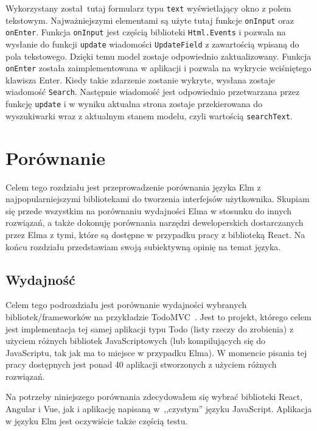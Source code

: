 \documentclass[twoside,a4paper]{report}
\begin{document}
Wykorzystany został tutaj formularz typu \texttt{text} wyświetlający okno z polem tekstowym.
Najważniejszymi elementami są użyte tutaj funkcje \texttt{onInput} oraz \texttt{onEnter}.
Funkcja \texttt{onInput} jest częścią biblioteki \texttt{Html.Events} i pozwala na wysłanie do funkcji \texttt{update} wiadomości \texttt{UpdateField} z zawartością wpisaną do pola tekstowego.
Dzięki temu model zostaje odpowiednio zaktualizowany.
Funkcja \texttt{onEnter} została zaimplementowana w aplikacji i pozwala na wykrycie wciśniętego klawisza Enter.
Kiedy takie zdarzenie zostanie wykryte, wysłana zostaje wiadomość \texttt{Search}.
Następnie wiadomość jest odpowiednio przetwarzana przez funkcję \texttt{update} i w wyniku aktualna strona zostaje przekierowana do wyszukiwarki wraz z aktualnym stanem modelu, czyli wartością \texttt{searchText}.


\chapter{Porównanie}
Celem tego rozdziału jest przeprowadzenie porównania języka Elm z najpopularniejszymi bibliotekami do tworzenia interfejsów użytkownika.
Skupiam się przede wszystkim na porównaniu wydajności Elma w stosunku do innych rozwiązań, a także dokonuję porównania narzędzi deweloperskich dostarczanych przez Elma z tymi, które są dostępne w przypadku pracy z biblioteką React.
Na końcu rozdziału przedstawiam swoją subiektywną opinię na temat języka.

\section{Wydajność}
Celem tego podrozdziału jest porównanie wydajności wybranych bibliotek/frameworków na przykładzie TodoMVC~\cite{todomvc}.
Jest to projekt, którego celem jest implementacja tej samej aplikacji typu Todo (listy rzeczy do zrobienia) z użyciem różnych bibliotek JavaScriptowych (lub kompilujących się do JavaScriptu, tak jak ma to miejsce w przypadku Elma).
W momencie pisania tej pracy dostępnych jest ponad 40 aplikacji stworzonych z użyciem różnych rozwiązań.

Na potrzeby niniejszego porównania zdecydowałem się wybrać biblioteki React, Angular i Vue, jak i aplikację napisaną w~,,czystym'' języku JavaScript.
Aplikacja w języku Elm jest oczywiście także częścią testu.
\end{document}
